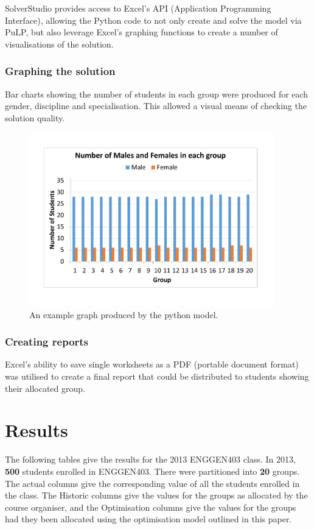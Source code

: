\documentclass[12pt]{ORSNZ}
\begin{document}
SolverStudio provides access to Excel's API (Application Programming Interface), allowing the Python code to not only create and solve the model via PuLP, but also leverage Excel's graphing functions to create a number of visualisations of the solution.

\subsubsection{Graphing the solution}
Bar charts showing the number of students in each group were produced for each gender, discipline and specialisation. This allowed a visual means of checking the solution quality. 

\begin{figure}[!ht]
	\centering
	\includegraphics[width=0.95\textwidth]{gender_2014.pdf}
	\caption{An example graph produced by the python model.}
\end{figure}

\subsubsection{Creating reports}
Excel's ability to save single worksheets as a PDF (portable document format) was utilised to create a final report that could be distributed to students showing their allocated group.

\section{Results}
The following tables give the results for the 2013 ENGGEN403 class. In 2013, \textbf{500} students enrolled in ENGGEN403. There were partitioned into \textbf{20} groups. The actual columns give the corresponding value of all the students enrolled in the class. The Historic columns give the values for the groups as allocated by the course organiser, and the Optimisation columns give the values for the groups had they been allocated using the optimisation model outlined in this paper.
\end{document}
